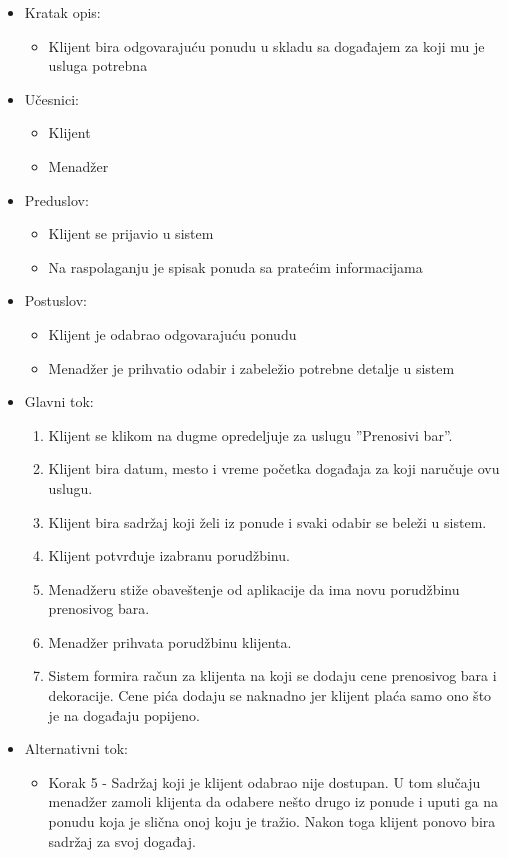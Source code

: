 \documentclass[a4paper]{article}
\begin{document}
\begin{itemize}
    \item Kratak opis:
        \begin{itemize}
            \item Klijent bira odgovarajuću ponudu u skladu sa događajem za koji mu je usluga potrebna
        \end{itemize}
    \item Učesnici:
        \begin{itemize}
            \item Klijent
            \item Menadžer 
        \end{itemize}
    \item Preduslov:
        \begin{itemize}
            \item Klijent se prijavio u sistem
		    \item Na raspolaganju je spisak ponuda sa pratećim informacijama
        \end{itemize}
    \item Postuslov:
        \begin{itemize}
            \item Klijent je odabrao odgovarajuću ponudu
            \item Menadžer je prihvatio odabir i zabeležio potrebne detalje u sistem
        \end{itemize}
    \item Glavni tok:
        \begin{enumerate}
          \item  Klijent se klikom na dugme opredeljuje za uslugu ''Prenosivi bar''.
        \item Klijent bira datum, mesto i vreme početka događaja za koji naručuje ovu uslugu.
        \item Klijent bira sadržaj koji želi iz ponude i svaki odabir se beleži u sistem.
        \item Klijent potvrđuje izabranu porudžbinu.
        \item Menadžeru stiže obaveštenje od aplikacije da ima novu porudžbinu prenosivog bara.
        \item Menadžer prihvata porudžbinu klijenta.
        \item Sistem formira račun za klijenta na koji se dodaju cene prenosivog bara i dekoracije. Cene pića dodaju se naknadno jer klijent plaća samo ono što je na događaju popijeno.
        \end{enumerate}
        \item Alternativni tok:
        \begin{itemize}
            \item Korak 5 - Sadržaj koji je klijent odabrao nije dostupan. U tom slučaju menadžer zamoli klijenta da odabere nešto drugo iz ponude i uputi ga na ponudu koja je slična onoj koju je tražio. Nakon toga klijent ponovo bira sadržaj za svoj događaj.
        \end{itemize}    
    \end{itemize}
\end{document}
